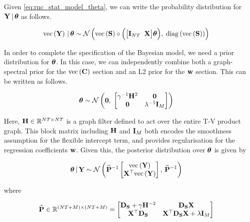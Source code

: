 Given \cref{eq:rnc_stat_model_theta}, we can write the probability distribution for $\mathbf{Y} \, | \, \boldsymbol{\theta}$ as follows.  

\begin{equation}
    \label{eq:Y_given_theta_rnc}
    \text{\textup{vec}}\left(\mathbf{Y}\right) \, | \, \boldsymbol{\theta} \sim \mathcal{N}\left(\text{\textup{vec}}\left(\mathbf{S}\right) \circ \Big( \big[ \mathbf{I}_{NT} \;\; \mathbf{X} \big]\boldsymbol{\theta} \Big), \; \text{\textup{diag}}\left(\text{\textup{vec}}\left(\mathbf{S}\right)\right)\right)
\end{equation}

In order to complete the specification of the Bayesian model, we need a prior distribution for $\boldsymbol{\theta}$. In this case, we can independently combine both a graph-spectral prior for the $\text{\textup{vec}}\left(\mathbf{C}\right)$ section and an L2 prior for the $\mathbf{w}$ section. This can be written as follows. 

\begin{equation}
    \label{eq:theta_prior}
    \boldsymbol{\theta} \sim \mathcal{N}\left( \mathbf{0}, \; \begin{bmatrix} \gamma^{-1} \mathbf{H}^2 & \mathbf{0} \\ \mathbf{0} & \lambda^{-1} \mathbf{I}_M \end{bmatrix} \right)
\end{equation}

Here, $\mathbf{H} \in \mathbb{R}^{NT \times NT}$ is a graph filter defined to act over the entire T-V product graph. This block matrix including $\mathbf{H}$ and $\mathbf{I}_M$ both encodes the smoothness assumption for the flexible intercept term, and provides regularisation for the regression coefficients $\mathbf{w}$. Given this, the posterior distribution over $\boldsymbol{\theta}$ is given by 

\begin{equation}
    \boldsymbol{\theta} \, | \, \mathbf{Y} \sim \mathcal{N}\left(\widetilde{\mathbf{P}}^{-1} \begin{bmatrix} \text{\textup{vec}}\left(\mathbf{Y}\right) \\ \mathbf{X}^\top \text{\textup{vec}}\left(\mathbf{Y}\right) \end{bmatrix}, \, \widetilde{\mathbf{P}}^{-1}\right)
\end{equation}

where 

\begin{equation}
    \widetilde{\mathbf{P}} \in \mathbb{R}^{(NT + M) \times (NT + M)}= 
    \begin{bmatrix}
     \mathbf{D}_{\mathbf{S}} + \gamma \mathbf{H}^{-2} & \mathbf{D}_{\mathbf{S}}  \mathbf{X} \\
     \mathbf{X}^\top \mathbf{D}_{\mathbf{S}} & \mathbf{X}^\top \mathbf{D}_{\mathbf{S}} \mathbf{X} + \lambda \mathbf{I}_M   
    \end{bmatrix}
\end{equation}


